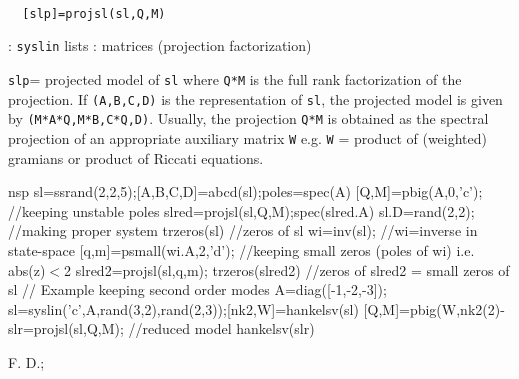 \begin{mandesc}
   \\ %
\end{mandesc}
\begin{calling_sequence}
\begin{verbatim}
  [slp]=projsl(sl,Q,M)  
\end{verbatim}
\end{calling_sequence}
\begin{parameters}
  \begin{varlist}
    : \verb!syslin! lists
    : matrices (projection factorization)
  \end{varlist}
\end{parameters}
\begin{mandescription}
  \verb!slp!= projected model of \verb!sl! where \verb!Q*M! is the full rank 
  factorization of the projection.
  If \verb!(A,B,C,D)! is the representation of \verb!sl!, the projected model
  is given by \verb!(M*A*Q,M*B,C*Q,D)!.
  Usually, the projection \verb!Q*M! is obtained as the spectral projection
  of an appropriate auxiliary matrix \verb!W! e.g. \verb!W! = product
  of (weighted) gramians or product of Riccati equations.
\end{mandescription}
\begin{examples}
  \begin{mintednsp}{nsp}
    sl=ssrand(2,2,5);[A,B,C,D]=abcd(sl);poles=spec(A)
    [Q,M]=pbig(A,0,'c');  //keeping unstable poles
    slred=projsl(sl,Q,M);spec(slred.A)
    sl.D=rand(2,2);  //making proper system
    trzeros(sl)  //zeros of sl
    wi=inv(sl);  //wi=inverse in state-space
    [q,m]=psmall(wi.A,2,'d');  //keeping small zeros (poles of wi) i.e. abs(z)$<$2
    slred2=projsl(sl,q,m);
    trzeros(slred2)  //zeros of slred2 = small zeros of sl
    //  Example keeping second order modes
    A=diag([-1,-2,-3]);
    sl=syslin('c',A,rand(3,2),rand(2,3));[nk2,W]=hankelsv(sl)
    [Q,M]=pbig(W,nk2(2)-%
    slr=projsl(sl,Q,M);  //reduced model
    hankelsv(slr)
  \end{mintednsp}
\end{examples}
\begin{manseealso}
\end{manseealso}
\begin{authors}
  F. D.;   
\end{authors}
